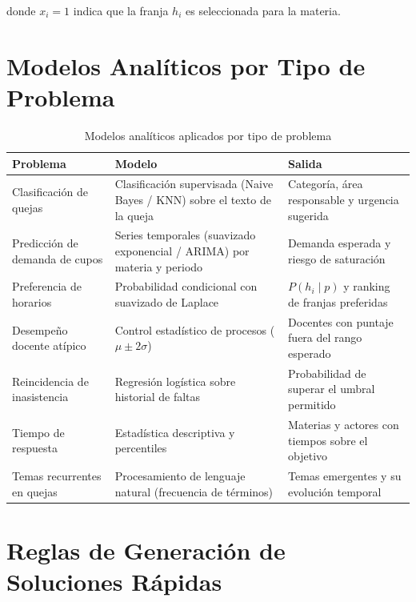 donde $x_i = 1$ indica que la franja $h_i$ es seleccionada para la materia.

\section{Modelos Analíticos por Tipo de Problema}

\begin{table}[H]
\centering
\caption{Modelos analíticos aplicados por tipo de problema}
\label{tab:modelos}
\small
\begin{tabularx}{\textwidth}{@{}p{3.2cm} p{6.6cm} X@{}}
\toprule
\rowcolor{azulClaro}
\textbf{Problema} & \textbf{Modelo} & \textbf{Salida} \\
\midrule
Clasificación de quejas &
  Clasificación supervisada (Naive Bayes / \ac{KNN}) sobre el texto de la queja &
  Categoría, área responsable y urgencia sugerida \\
Predicción de demanda de cupos &
  Series temporales (suavizado exponencial / ARIMA) por materia y periodo &
  Demanda esperada y riesgo de saturación \\
Preferencia de horarios &
  Probabilidad condicional con suavizado de Laplace &
  $P(h_i \mid p)$ y ranking de franjas preferidas \\
Desempeño docente atípico &
  Control estadístico de procesos ($\mu \pm 2\sigma$) &
  Docentes con puntaje fuera del rango esperado \\
Reincidencia de inasistencia &
  Regresión logística sobre historial de faltas &
  Probabilidad de superar el umbral permitido \\
Tiempo de respuesta &
  Estadística descriptiva y percentiles &
  Materias y actores con tiempos sobre el objetivo \\
Temas recurrentes en quejas &
  Procesamiento de lenguaje natural (frecuencia de términos) &
  Temas emergentes y su evolución temporal \\
\bottomrule
\end{tabularx}
\end{table}

\section{Reglas de Generación de Soluciones Rápidas}

